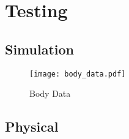 \chapter{Testing}
\section{Simulation}
\begin{figure}[h]
    \centering
    \texttt{[image: body\_data.pdf]}
    \caption{Body Data}
    \label{fig:body_data}
\end{figure}

\section{Physical}
